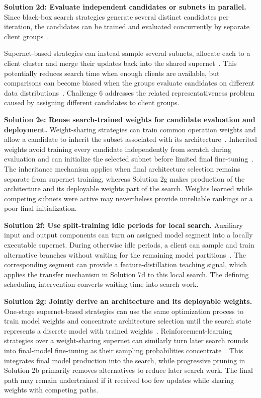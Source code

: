 \noindent\textbf{Solution 2d: Evaluate independent candidates or subnets in parallel.} Since black-box search strategies generate several distinct candidates per iteration, the candidates can be trained and evaluated concurrently by separate client groups~\cite{decnas_2022,rt_fed_evo_nas_2020,energy_fednas_2025}.

Supernet-based strategies can instead sample several subnets, allocate each to a client cluster and merge their updates back into the shared supernet~\cite{finch_2024}. This potentially reduces search time when enough clients are available, but comparisons can become biased when the groups evaluate candidates on different data distributions~\cite{decnas_2022}. Challenge 6 addresses the related representativeness problem caused by assigning different candidates to client groups.

\noindent\textbf{Solution 2e: Reuse search-trained weights for candidate evaluation and deployment.} Weight-sharing strategies can train common operation weights and allow a candidate to inherit the subset associated with its architecture~\cite{fl-agnns_2023,optimize_fednas_edge_2021}. Inherited weights avoid training every candidate independently from scratch during evaluation and can initialize the selected subnet before limited final fine-tuning~\cite{medical_image_segmentation_fednas_2024}. The inheritance mechanism applies when final architecture selection remains separate from supernet training, whereas Solution 2g makes production of the architecture and its deployable weights part of the search. Weights learned while competing subnets were active may nevertheless provide unreliable rankings or a poor final initialization.

\noindent\textbf{Solution 2f: Use split-training idle periods for local search.} Auxiliary input and output components can turn an assigned model segment into a locally executable supernet. During otherwise idle periods, a client can sample and train alternative branches without waiting for the remaining model partitions~\cite{nasfly_2024}. The corresponding segment can provide a feature-distillation teaching signal, which applies the transfer mechanism in Solution 7d to this local search. The defining scheduling intervention converts waiting time into search work.

\noindent\textbf{Solution 2g: Jointly derive an architecture and its deployable weights.} One-stage supernet-based strategies can use the same optimization process to train model weights and concentrate architecture selection until the search state represents a discrete model with trained weights~\cite{dfnas_2020,fed_meta_nas_2025}. Reinforcement-learning strategies over a weight-sharing supernet can similarly turn later search rounds into final-model fine-tuning as their sampling probabilities concentrate~\cite{perfedrlnas_2024}. This integrates final model production into the search, while progressive pruning in Solution 2b primarily removes alternatives to reduce later search work. The final path may remain undertrained if it received too few updates while sharing weights with competing paths.

